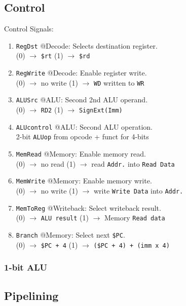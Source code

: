 \documentclass[12pt, a4paper]{article}
\begin{document}
\begin{multicols*}{3}
\colbreak
\subsection{Control}
Control Signals:
\begin{enumerate}[\roman*.]
  \item \lstinline|RegDst| @Decode: Selects destination register.\\
    (0) $\rightarrow$ \lstinline|$rt|
    (1) $\rightarrow$ \lstinline|$rd|
  \item \lstinline|RegWrite| @Decode: Enable register write.\\
    (0) $\rightarrow$ no write
    (1) $\rightarrow$ \lstinline|WD| written to \lstinline|WR|
  \item \lstinline|ALUSrc| @ALU: Second 2nd ALU operand.\\ 
    (0) $\rightarrow$ \lstinline|RD2|
    (1) $\rightarrow$ \lstinline|SignExt(Imm)|
  \item \lstinline|ALUcontrol| @ALU: Second ALU operation.\\
    2-bit \lstinline|ALUop| from opcode + funct for 4-bits
  \item \lstinline|MemRead| @Memory: Enable memory read.\\
    (0) $\rightarrow$ no read
    (1) $\rightarrow$ read \lstinline|Addr.| into \lstinline|Read Data|
  \item \lstinline|MemWrite| @Memory: Enable memory write.\\
    (0) $\rightarrow$ no write
    (1) $\rightarrow$ write \lstinline|Write Data| into \lstinline|Addr.|
  \item \lstinline|MemToReg| @Writeback: Select writeback result.\\
    (0) $\rightarrow$ \lstinline|ALU result|
    (1) $\rightarrow$ Memory \lstinline|Read data|
  \item \lstinline|Branch| @Memory: Select next \lstinline|$PC|.\\
    (0) $\rightarrow$ \lstinline|$PC + 4|
    (1) $\rightarrow$ \lstinline|($PC + 4) + (imm x 4)|
\end{enumerate}

\subsubsection{1-bit ALU}

\subsection{Pipelining}


\end{multicols*}
\end{document}
